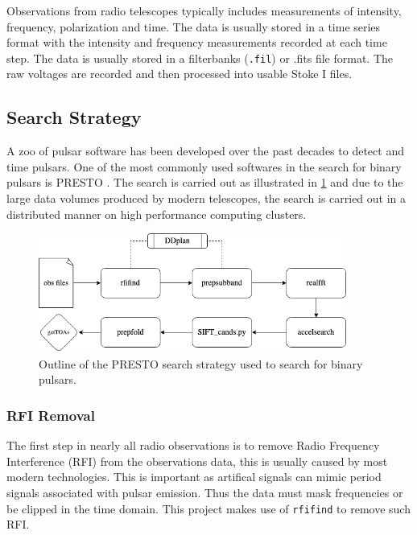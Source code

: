 Observations from radio telescopes typically includes measurements of intensity, frequency, polarization and time. The data is usually stored in a time series format with the intensity and frequency measurements recorded at each time step. The data is usually stored in a  filterbanks (\texttt{.fil}) or .fits file format. The raw voltages are recorded and then processed into usable Stoke I files. 

\subsection{Search Strategy}

A zoo of pulsar software has been developed over the past decades to detect and time pulsars. One of the most commonly used softwares in the search for binary pulsars is PRESTO \citep{ransom_new_2001}. The search is carried out as illustrated in \cref{fig: presto-work-flow} and due to the large data volumes produced by modern telescopes, the search is carried out in a distributed manner on high performance computing clusters. \\ 

\begin{figure}
    \centering
    \includegraphics[width = 0.9\textwidth]{figs/presto-work-flow.drawio.png}
    \caption{Outline of the PRESTO search strategy used to search for binary pulsars.}
    \label{fig: presto-work-flow}
\end{figure}

\subsubsection{RFI Removal}

The first step in nearly all radio observations is to remove Radio Frequency Interference (RFI) from the observations data, this is usually caused by most modern technologies. This is important as artifical signals can mimic period signals associated with pulsar emission. Thus the data must mask frequencies or be clipped in the time domain. This project makes use of \texttt{rfifind} to remove such RFI. 

